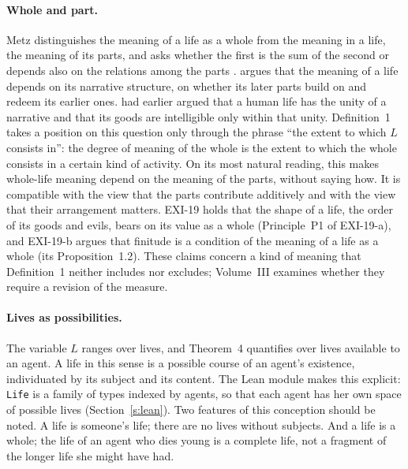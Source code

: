 \paragraph{Whole and part.} Metz distinguishes the meaning of a life as a whole from the meaning in a life, the meaning of its parts, and asks whether the first is the sum of the second or depends also on the relations among the parts \citep{Metz2013}. \citet{Kauppinen2012} argues that the meaning of a life depends on its narrative structure, on whether its later parts build on and redeem its earlier ones. \citet{MacIntyre1981} had earlier argued that a human life has the unity of a narrative and that its goods are intelligible only within that unity. Definition~1 takes a position on this question only through the phrase \enquote{the extent to which $L$ consists in}: the degree of meaning of the whole is the extent to which the whole consists in a certain kind of activity. On its most natural reading, this makes whole-life meaning depend on the meaning of the parts, without saying how. It is compatible with the view that the parts contribute additively and with the view that their arrangement matters. EXI-19 holds that the shape of a life, the order of its goods and evils, bears on its value as a whole (Principle~P1 of EXI-19-a), and EXI-19-b argues that finitude is a condition of the meaning of a life as a whole (its Proposition~1.2). These claims concern a kind of meaning that Definition~1 neither includes nor excludes; Volume~III examines whether they require a revision of the measure.

\paragraph{Lives as possibilities.} The variable $L$ ranges over lives, and Theorem~4 quantifies over lives available to an agent. A life in this sense is a possible course of an agent's existence, individuated by its subject and its content. The Lean module makes this explicit: \texttt{Life} is a family of types indexed by agents, so that each agent has her own space of possible lives (Section~\ref{s:lean}). Two features of this conception should be noted. A life is someone's life; there are no lives without subjects. And a life is a whole; the life of an agent who dies young is a complete life, not a fragment of the longer life she might have had.


